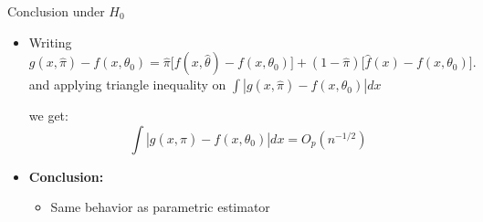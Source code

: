 \begin{frame}{Conclusion under $H_0$}
\begin{itemize}
    \item Writing $
g(x,\hat\pi) - f(x,\theta_0) 
= \hat\pi \big[ f(x,\hat\theta) - f(x,\theta_0) \big] 
+ (1 - \hat\pi)\big[ \hat f(x) - f(x,\theta_0) \big].
$ and applying triangle inequality on  $
    \int |g(x,\hat{\pi}) - f(x,\theta_0)| dx 
    $  

    we get:
    \[
    \int |g(x,\hat{\pi}) - f(x,\theta_0)| dx = O_p(n^{-1/2})
    \]

    \item \textbf{Conclusion:}
    \begin{itemize}
        \item Same behavior as parametric estimator
    \end{itemize}
\end{itemize}
\end{frame}

